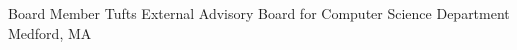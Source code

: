 

\begin{cvhonors}

  \cvhonor
    {Board Member} %
    {Tufts External Advisory Board for Computer Science Department} %
    {Medford, MA} %
    {} %

\end{cvhonors}
